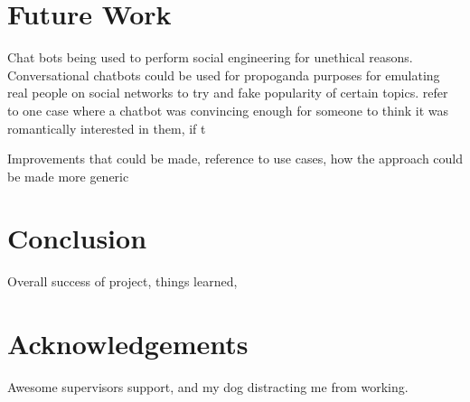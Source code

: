 \documentclass{article}
\begin{document}
\section{Future Work}

Chat bots being used to perform social engineering for unethical reasons. Conversational chatbots could be used for propoganda purposes for emulating real people on social networks to try and fake popularity of certain topics. \cite{conveval} refer to one case where a chatbot was convincing enough for someone to think it was romantically interested in them, if t

Improvements that could be made, reference to use cases, how the approach could be made more generic

\section{Conclusion}

Overall success of project, things learned, 

\section{Acknowledgements}

Awesome supervisors support, and my dog distracting me from working.




\vspace{12pt}
\end{document}

